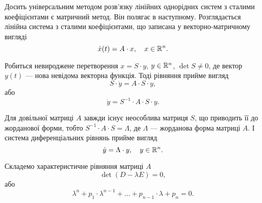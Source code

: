 Досить універсальним методом розв’язку лінійних однорідних систем з сталими коефіцієнтами є матричний метод. Він полягає в наступному. Розглядається лінійна система з сталими коефіцієнтами, що записана у векторно-матричному вигляді
\begin{equation*}
	\dot x(t) = A \cdot x, \quad x \in \mathbb{R}^n.	
\end{equation*}

Робиться невироджене перетворення $x = S \cdot y$, $y \in \mathbb{R}^n$, $\det S \ne 0$, де вектор $y(t)$ --- нова невідома векторна функція. Тоді рівняння прийме вигляд
\begin{equation*}
	S \cdot \dot y = A \cdot S \cdot y,
\end{equation*}
або
\begin{equation*}
	\dot y = S^{-1} \cdot A \cdot S \cdot y.
\end{equation*}

Для довільної матриці $A$ завжди існує неособлива матриця $S$, що приводить її до жорданової форми, тобто $S^{-1} \cdot A \cdot S = \Lambda$, де $\Lambda$ --- жорданова форма матриці $A$. І система диференціальних рівнянь прийме вигляд
\begin{equation*}
	\dot y = \Lambda \cdot y, \quad y \in \mathbb{R}^n.
\end{equation*}

Складемо характеристичне рівняння матриці $A$
\begin{equation*}
	\det (D - \lambda E) = 0,
\end{equation*}
або
\begin{equation*}
	\lambda^n + p_1 \cdot \lambda^{n - 1} + \ldots + p_{n - 1} \cdot \lambda + p_n = 0.
\end{equation*}

